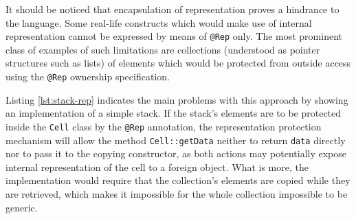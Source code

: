 \documentclass{pracamgr}
\theoremstyle{all}
\begin{document}
It should be noticed that encapsulation of representation proves a
hindrance to the language. Some real-life constructs which would make
use of internal representation cannot be expressed by means of
\texttt{@Rep} only. The most prominent class of examples of such
limitations are collections (understood as pointer structures such as
lists) of elements which would be protected from outside access using
the \texttt{@Rep} ownership specification.



Listing \ref{lst:stack-rep} indicates the main problems with this
approach by showing an implementation of a simple stack. If the
stack's elements are to be protected inside the \texttt{Cell} class by
the \texttt{@Rep} annotation, the representation protection mechanism
will allow the method \texttt{Cell::getData} neither to return
\texttt{data} directly nor to pass it to the copying constructor, as
both actions may potentially expose internal representation of the
cell to a foreign object. What is more, the implementation would
require that the collection's elements are copied while they are
retrieved, which makes it impossible for the whole collection
impossible to be generic.


\end{document}

